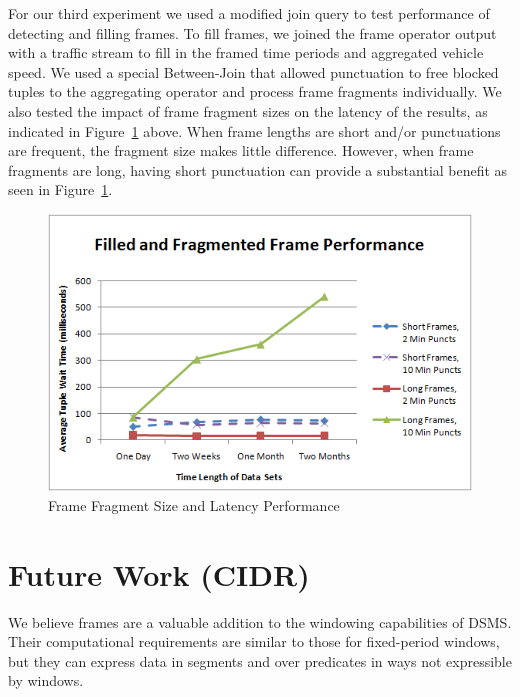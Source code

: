 \documentclass{vldb}
\begin{document}
\begin{appendix}
For our third experiment we used a modified join query to test performance of detecting and filling frames. To fill frames, we joined the frame operator output with a traffic stream to fill in the framed time periods and aggregated vehicle speed. We used a special Between-Join that allowed punctuation to free blocked tuples to the aggregating operator and process frame fragments individually. We also tested the impact of frame fragment sizes on the latency of the results, as indicated in Figure~\ref{fig:eval-fragments} above. When frame lengths are short and/or punctuations are frequent, the fragment size makes little difference. However, when frame fragments are long, having short punctuation can provide a substantial benefit as seen in Figure~\ref{fig:eval-fragments}.

\begin{figure}[htb]
   \centering
   \includegraphics[width=.99\columnwidth]{figures/eval-fragments}
   \caption{Frame Fragment Size and Latency Performance}
   \label{fig:eval-fragments}
\end{figure}

\section{Future Work (CIDR)}
\label{sec:futurework}

We believe frames are a valuable addition to the windowing capabilities of DSMS. Their computational requirements are similar to those for fixed-period windows, but they can express data in segments and over predicates in ways not expressible by windows.


\end{appendix}
\end{document}
